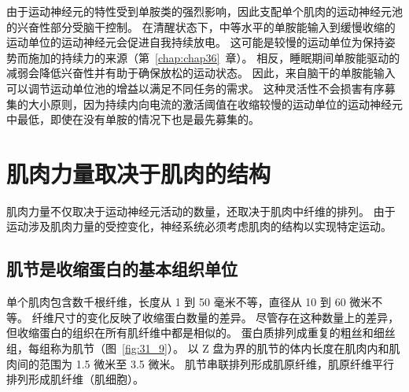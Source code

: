 由于运动神经元的特性受到单胺类的强烈影响，因此支配单个肌肉的运动神经元池的兴奋性部分受脑干控制。
在清醒状态下，中等水平的单胺能输入到缓慢收缩的运动单位的运动神经元会促进自我持续放电。
这可能是较慢的运动单位为保持姿势而施加的持续力的来源（第~\ref{chap:chap36}~章）。
相反，睡眠期间单胺能驱动的减弱会降低兴奋性并有助于确保放松的运动状态。
因此，来自脑干的单胺能输入可以调节运动单位池的增益以满足不同任务的需求。
这种灵活性不会损害有序募集的大小原则，因为持续内向电流的激活阈值在收缩较慢的运动单位的运动神经元中最低，即使在没有单胺的情况下也是最先募集的。



\section{肌肉力量取决于肌肉的结构}

肌肉力量不仅取决于运动神经元活动的数量，还取决于肌肉中纤维的排列。
由于运动涉及肌肉力量的受控变化，神经系统必须考虑肌肉的结构以实现特定运动。



\subsection{肌节是收缩蛋白的基本组织单位}

单个肌肉包含数千根纤维，长度从 1 到 50 毫米不等，直径从 10 到 60 微米不等。
纤维尺寸的变化反映了收缩蛋白数量的差异。
尽管存在这种数量上的差异，但收缩蛋白的组织在所有肌纤维中都是相似的。 
蛋白质排列成重复的粗丝和细丝组，每组称为肌节（图~\ref{fig:31_9}）。
以 Z 盘为界的肌节的体内长度在肌肉内和肌肉间的范围为 1.5 微米至 3.5 微米。
肌节串联排列形成肌原纤维，肌原纤维平行排列形成肌纤维（肌细胞）。



